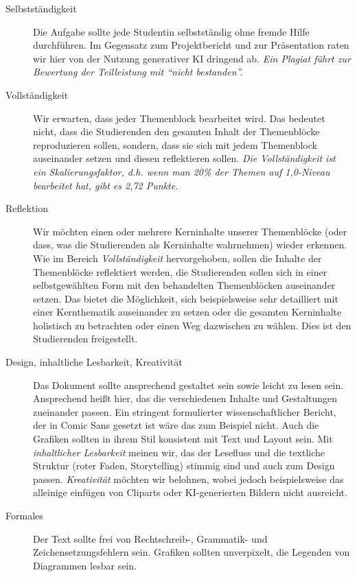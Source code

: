 \documentclass[DIV=15,headinclude=true]{scrreprt}
\begin{document}
\begin{description}
	\item[Selbstständigkeit]
		Die Aufgabe sollte jede Studentin selbstständig ohne fremde Hilfe
		durchführen. Im Gegensatz zum Projektbericht und zur Präsentation raten wir hier von der Nutzung generativer KI dringend ab. \emph{Ein Plagiat führt zur Bewertung der Teilleistung mit ``nicht bestanden''.}
	\item[Vollständigkeit]
		Wir erwarten, dass jeder Themenblock bearbeitet wird. Das bedeutet
		nicht, dass die Studierenden den gesamten Inhalt der Themenblöcke
		reproduzieren sollen, sondern, dass sie sich mit jedem Themenblock
		auseinander setzen und diesen reflektieren sollen. \emph{Die Vollständigkeit ist ein Skalierungsfaktor, d.h. wenn man 20\% der Themen auf 1,0-Niveau bearbeitet hat, gibt es 2,72 Punkte.}
	\item[Reflektion]
		Wir möchten einen oder mehrere Kerninhalte unserer Themenblöcke (oder
		dass, was die Studierenden als Kerninhalte wahrnehmen) wieder erkennen.
		Wie im Bereich \emph{Vollständigkeit} hervorgehoben, sollen die Inhalte
		der Themenblöcke reflektiert werden, die Studierenden sollen sich in
		einer selbstgewählten Form mit den behandelten Themenblöcken auseinander
		setzen. Das bietet die Möglichkeit, sich beispielsweise sehr detailliert
		mit einer Kernthematik auseinander zu setzen oder die gesamten
		Kerninhalte holistisch zu betrachten oder einen Weg dazwischen zu
		wählen. Dies ist den Studierenden freigestellt.
	\item[Design, inhaltliche Lesbarkeit, Kreativität] Das Dokument sollte ansprechend gestaltet sein sowie leicht zu lesen sein. Ansprechend heißt hier, das die verschiedenen Inhalte und Gestaltungen zueinander passen. Ein stringent formulierter wissenschaftlicher Bericht, der in Comic Sans gesetzt ist wäre das zum Beispiel nicht. Auch die Grafiken sollten in ihrem Stil konsistent mit Text und Layout sein. Mit \emph{inhaltlicher Lesbarkeit} meinen wir, das der Lesefluss und die textliche Struktur (roter Faden, Storytelling) stimmig sind und auch zum Design passen. \emph{Kreativität} möchten wir belohnen, wobei jedoch beispielsweise das alleinige einfügen von Cliparts oder KI-generierten Bildern nicht ausreicht.
	\item[Formales]
		Der Text sollte frei von Rechtschreib-, Grammatik- und Zeichensetzungsfehlern sein. Grafiken sollten unverpixelt, die Legenden von Diagrammen lesbar sein.
\end{description}
\end{document}
